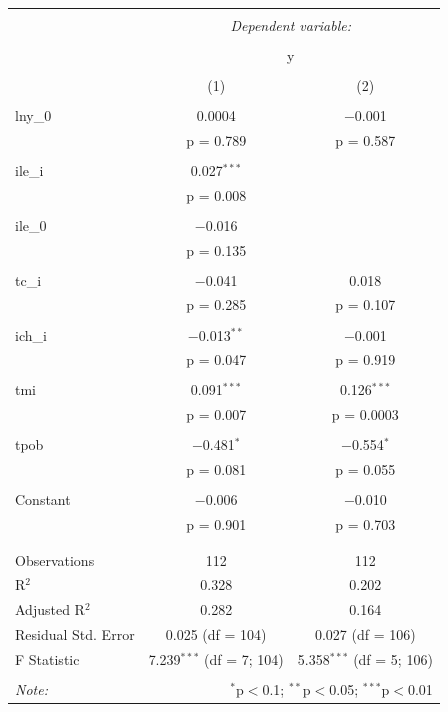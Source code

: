 \begin{table}[!htbp] \centering 
    \tiny
  \caption{} 
  \label{} 
\begin{tabular}{@{\extracolsep{5pt}}lcc} 
\\[-1.8ex]\hline 
\hline \\[-1.8ex] 
 & \multicolumn{2}{c}{\textit{Dependent variable:}} \\ 
\cline{2-3} 
\\[-1.8ex] & \multicolumn{2}{c}{y} \\ 
\\[-1.8ex] & (1) & (2)\\ 
\hline \\[-1.8ex] 
 lny\_0 & 0.0004 & $-$0.001 \\ 
  & p = 0.789 & p = 0.587 \\ 
  & & \\ 
 ile\_i & 0.027$^{***}$ &  \\ 
  & p = 0.008 &  \\ 
  & & \\ 
 ile\_0 & $-$0.016 &  \\ 
  & p = 0.135 &  \\ 
  & & \\ 
 tc\_i & $-$0.041 & 0.018 \\ 
  & p = 0.285 & p = 0.107 \\ 
  & & \\ 
 ich\_i & $-$0.013$^{**}$ & $-$0.001 \\ 
  & p = 0.047 & p = 0.919 \\ 
  & & \\ 
 tmi & 0.091$^{***}$ & 0.126$^{***}$ \\ 
  & p = 0.007 & p = 0.0003 \\ 
  & & \\ 
 tpob & $-$0.481$^{*}$ & $-$0.554$^{*}$ \\ 
  & p = 0.081 & p = 0.055 \\ 
  & & \\ 
 Constant & $-$0.006 & $-$0.010 \\ 
  & p = 0.901 & p = 0.703 \\ 
  & & \\ 
\hline \\[-1.8ex] 
Observations & 112 & 112 \\ 
R$^{2}$ & 0.328 & 0.202 \\ 
Adjusted R$^{2}$ & 0.282 & 0.164 \\ 
Residual Std. Error & 0.025 (df = 104) & 0.027 (df = 106) \\ 
F Statistic & 7.239$^{***}$ (df = 7; 104) & 5.358$^{***}$ (df = 5; 106) \\ 
\hline 
\hline \\[-1.8ex] 
\textit{Note:}  & \multicolumn{2}{r}{$^{*}$p$<$0.1; $^{**}$p$<$0.05; $^{***}$p$<$0.01} \\ 
\end{tabular} 
\end{table}


